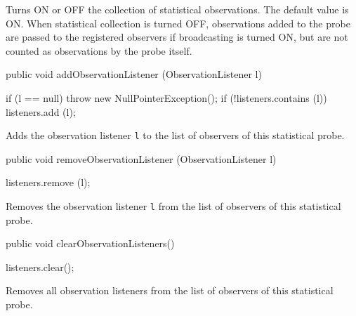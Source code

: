 \begin{tabb}  Turns ON or OFF the collection of statistical
  observations.  The default value is ON.
  When statistical collection is turned OFF,
  observations added to the probe are passed to the
  registered observers if broadcasting is turned ON, but are not
  counted as observations by the probe itself.
\end{tabb}
\begin{htmlonly}
\end{htmlonly}
\begin{code}

   public void addObservationListener (ObservationListener l)\begin{hide} {
      if (l == null)
         throw new NullPointerException();
      if (!listeners.contains (l))
         listeners.add (l);
   }\end{hide}
\end{code}
\begin{tabb}   Adds the observation listener \texttt{l} to the list of observers of
    this statistical probe.
\end{tabb}
\begin{htmlonly}
\end{htmlonly}
\begin{code}

   public void removeObservationListener (ObservationListener l)\begin{hide} {
      listeners.remove (l);
   }\end{hide}
\end{code}
\begin{tabb}   Removes the observation listener \texttt{l} from the list of observers of
    this statistical probe.
\end{tabb}
\begin{htmlonly}
\end{htmlonly}
\begin{code}

   public void clearObservationListeners()\begin{hide} {
      listeners.clear();
   }\end{hide}
\end{code}
\begin{tabb}   Removes all observation listeners from the list of observers of
    this statistical probe.
\end{tabb}
